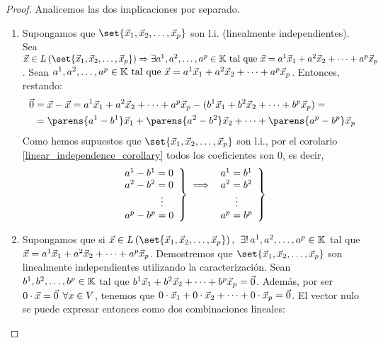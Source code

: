 \documentclass[../algebra_lineal.tex]{subfiles}
\begin{document}
\begin{proof}

    Analicemos las dos implicaciones por separado.
    \begin{enumerate}[itemindent=20pt]
        \item[\protect\fbox{a) $\Rightarrow$ b)}] Supongamos que $\set{\vlst{x}{p}}$ son l.i. (linealmente independientes). \\
        Sea $\vx \in \lspan{\set{\vlst{x}{p}}} \Rightarrow \exists \slst{a}{p} \in \K \st \vx = \lincomb{a}{x}{p}$. Sean ${a}^{1}, {a}^{2}, \dots, {a}^{p} \in \mathbb{K} \mathrm{\,\, tal \,\, que \,\,} \vec{x} = {a}^{1}\vec{x}_{1}+{a}^{2}\vec{x}_{2}+\dots+{a}^{p}\vec{x}_{p}$. Entonces, restando:
        \begin{align*}
            \zv &= \vx - \vx = \lincomb{a}{x}{p} - (\lincomb{b}{x}{p}) = \\
                &= \parens{a^1-b^1}\vx_1 + \parens{a^2-b^2}\vx_2 + \dots + \parens{a^p-b^p}\vx_p
        \end{align*}
        Como hemos supuestos que $\set{\vlst{x}{p}}$ son l.i., por el corolario \ref{linear_independence_corollary} todos los coeficientes son 0, es decir,
        \[
            \begin{array}[t].{l}\}
            a^1-b^1 = 0 \\
            a^2-b^2 = 0 \\ 
            \hspace{12.74mm}\vdots \\
            a^p-b^p = 0
            \end{array}
            \begin{array}[t]{@{}c@{}}\\{}\implies {}\\{}\end{array}
            \begin{array}[t].{l}\}
                a^1 = b^1 \\
                a^2 = b^2 \\ 
                \hspace{5.3mm}\vdots \\
            a^p = b^p
            \end{array}
        \]
    
        \item[\protect\fbox{b) $\Rightarrow$ a)}] Supongamos que si $\vx \in \lspan{\set{\vlst{x}{p}}}, \spc \exists ! \, \slst{a}{p} \in \K $ tal que 
        \(\vec{x} = {a}^{1}\vec{x}_{1}+{a}^{2}\vec{x}_{2}+\dots+{a}^{p}\vec{x}_{p}\). Demostremos que $\set{\vlst{x}{p}}$ son linealmente independientes utilizando la caracterización. Sean ${b}^{1}, {b}^{2}, \dots, {b}^{p}\in \mathbb{K}$ tal que ${b}^{1}\vec{x}_{1}+{b}^{2}\vec{x}_{2}+\dots+{b}^{p}\vec{x}_{p} = \vec{0}$. Además, por ser $0\cdot \vec{x} = \vec{0} \hspace{1.5mm} \forall x \in V$, tenemos que $0 \cdot \vec{x}_1 + 0 \cdot \vec{x}_2 + \dots + 0 \cdot \vec{x}_p = \vec{0}$. El vector nulo se puede expresar entonces como dos combinaciones lineales:


\end{enumerate}
\end{proof}
\end{document}
